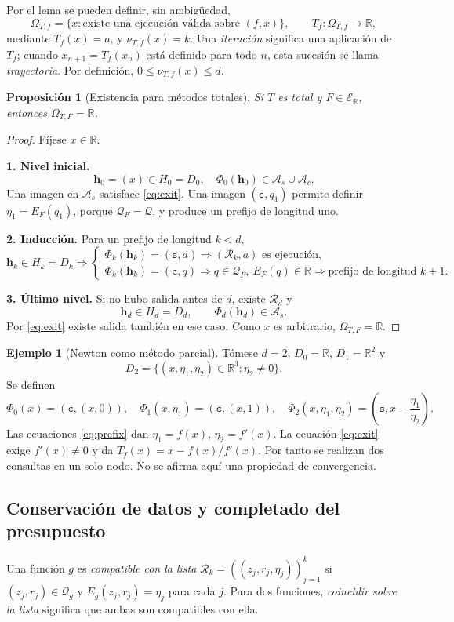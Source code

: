 \documentclass[11pt,a4paper]{article}
\numberwithin{equation}{section}
\newtheorem{proposition}[theorem]{Proposición}
\theoremstyle{definition}
\newtheorem{example}[theorem]{Ejemplo}
\theoremstyle{remark}
\newcommand{\R}{\mathbb R}
\newcommand{\ER}{\mathcal E_{\R}}
\newcommand{\QQ}{\mathcal Q}
\newcommand{\Rec}{\mathcal R}
\newcommand{\hc}{\mathbf h}
\newcommand{\ct}{\mathtt c}
\newcommand{\st}{\mathtt s}
\newcommand{\paso}[1]{\par\smallskip\noindent\textbf{#1}\quad}
\begin{document}
Por el lema se pueden definir, sin ambigüedad,
\[
\Omega_{T,f}=\{x:\text{existe una ejecución válida sobre }(f,x)\},\qquad
T_f:\Omega_{T,f}\to\R,
\]
mediante $T_f(x)=a$, y $\nu_{T,f}(x)=k$. Una \emph{iteración} significa una aplicación de $T_f$; cuando $x_{n+1}=T_f(x_n)$ está definido para todo $n$, esta sucesión se llama \emph{trayectoria}. Por definición, $0\le\nu_{T,f}(x)\le d$.

\begin{proposition}[Existencia para métodos totales]\label{prop:total}
Si $T$ es total y $F\in\ER$, entonces $\Omega_{T,F}=\R$.
\end{proposition}
\begin{proof}
Fíjese $x\in\R$.
\paso{1. Nivel inicial.}
\[
\hc_0=(x)\in H_0=D_0,
\quad\Phi_0(\hc_0)\in\mathcal A_s\cup\mathcal A_c.
\]
Una imagen en $\mathcal A_s$ satisface \eqref{eq:exit}. Una imagen $(\ct,q_1)$ permite definir $\eta_1=E_F(q_1)$, porque $\QQ_F=\QQ$, y produce un prefijo de longitud uno.
\paso{2. Inducción.}
Para un prefijo de longitud $k<d$,
\[
\hc_k\in H_k=D_k\Longrightarrow
\begin{cases}
\Phi_k(\hc_k)=(\st,a)\Rightarrow (\Rec_k,a)\text{ es ejecución},\\
\Phi_k(\hc_k)=(\ct,q)\Rightarrow q\in\QQ_F,\ E_F(q)\in\R
\Rightarrow\text{prefijo de longitud }k+1.
\end{cases}
\]
\paso{3. Último nivel.}
Si no hubo salida antes de $d$, existe $\Rec_d$ y
\[
\hc_d\in H_d=D_d,\qquad \Phi_d(\hc_d)\in\mathcal A_s.
\]
Por \eqref{eq:exit} existe salida también en ese caso. Como $x$ es arbitrario, $\Omega_{T,F}=\R$.
\end{proof}

\begin{example}[Newton como método parcial]\label{ex:newton}
Tómese $d=2$, $D_0=\R$, $D_1=\R^2$ y
\[
D_2=\{(x,\eta_1,\eta_2)\in\R^3:\eta_2\ne0\}.
\]
Se definen
\[
\Phi_0(x)=(\ct,(x,0)),\quad
\Phi_1(x,\eta_1)=(\ct,(x,1)),\quad
\Phi_2(x,\eta_1,\eta_2)=\left(\st,x-\frac{\eta_1}{\eta_2}\right).
\]
Las ecuaciones \eqref{eq:prefix} dan $\eta_1=f(x)$, $\eta_2=f'(x)$. La ecuación \eqref{eq:exit} exige $f'(x)\ne0$ y da $T_f(x)=x-f(x)/f'(x)$. Por tanto se realizan dos consultas en un solo nodo. No se afirma aquí una propiedad de convergencia.
\end{example}

\subsection{Conservación de datos y completado del presupuesto}
Una función $g$ es \emph{compatible con la lista} $\Rec_k=((z_j,r_j,\eta_j))_{j=1}^k$ si $(z_j,r_j)\in\QQ_g$ y $E_g(z_j,r_j)=\eta_j$ para cada $j$. Para dos funciones, \emph{coincidir sobre la lista} significa que ambas son compatibles con ella.
\end{document}
